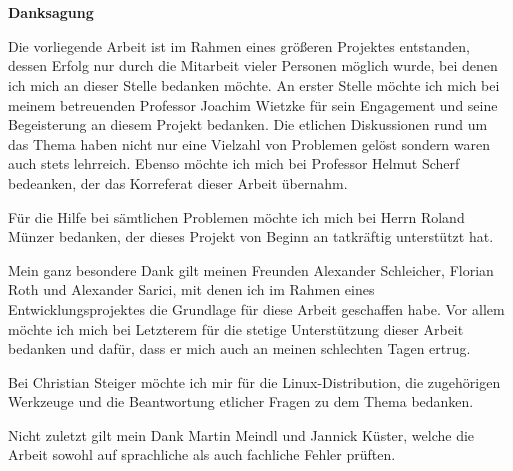 \pagestyle{scrheadings}            %
\chapter*{} \label{Danksagung}
\centerline{\Large \textsf{\textbf{Danksagung}}} %
\vspace{2ex}
Die vorliegende Arbeit ist im Rahmen eines größeren Projektes entstanden, dessen Erfolg nur durch die Mitarbeit vieler Personen möglich wurde, bei denen ich mich an dieser Stelle bedanken möchte. An erster Stelle möchte ich mich bei meinem betreuenden Professor Joachim Wietzke für sein Engagement und seine Begeisterung an diesem Projekt bedanken. Die etlichen Diskussionen rund um das Thema haben nicht nur eine Vielzahl von Problemen gelöst sondern waren auch stets lehrreich. Ebenso möchte ich mich bei Professor Helmut Scherf bedeanken, der das Korreferat dieser Arbeit übernahm.

Für die Hilfe bei sämtlichen Problemen möchte ich mich bei Herrn Roland Münzer bedanken, der dieses Projekt von Beginn an tatkräftig unterstützt hat.

Mein ganz besondere Dank gilt meinen Freunden Alexander Schleicher, Florian Roth und Alexander Sarici, mit denen ich im Rahmen eines Entwicklungsprojektes die Grundlage für diese Arbeit geschaffen habe. Vor allem möchte ich mich bei Letzterem für die stetige Unterstützung dieser Arbeit bedanken und dafür, dass er mich auch an meinen schlechten Tagen ertrug.

Bei Christian Steiger möchte ich mir für die Linux-Distribution, die zugehörigen Werkzeuge und die Beantwortung etlicher Fragen zu dem Thema bedanken.

Nicht zuletzt gilt mein Dank Martin Meindl und Jannick Küster, welche die Arbeit sowohl auf sprachliche als auch fachliche Fehler prüften.





\cleardoublepage